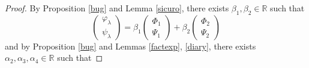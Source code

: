 \documentclass[11 pt]{amsart}
\theoremstyle{definition}
\theoremstyle{remark}
\numberwithin{equation}{section}
\begin{document}
\begin{proof}
  By Proposition \ref{bug} and Lemma \ref{sicuro}, there exists $\beta_1,
  \beta_2 \in \mathbb{R}$ such that
  \[ \left(\begin{array}{c}
       \varphi_{\lambda}\\
       \psi_{\lambda}
     \end{array}\right) = \beta_1 \left(\begin{array}{c}
       \Phi_1\\
       \Psi_1
     \end{array}\right) + \beta_2 \left(\begin{array}{c}
       \Phi_2\\
       \Psi_2
     \end{array}\right) \]
  and by Proposition \ref{bug} and Lemmas \ref{factexp}, \ref{diary}, there
  exists $\alpha_2, \alpha_3, \alpha_4 \in \mathbb{R}$ such that


\end{proof}
\end{document}
